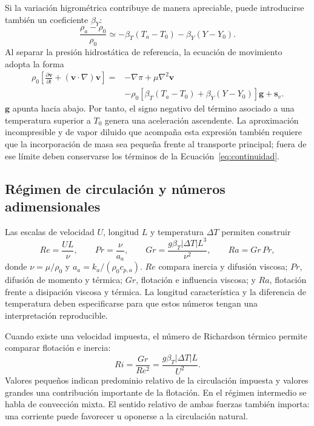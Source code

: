 Si la variación higrométrica contribuye de manera apreciable, puede introducirse también un coeficiente $\beta_Y$:
\begin{equation}
\frac{\rho_a-\rho_0}{\rho_0}
\simeq-\beta_T(T_a-T_0)-\beta_Y(Y-Y_0).
\label{eq:boussinesq_termohigrometrico}
\end{equation}
Al separar la presión hidrostática de referencia, la ecuación de movimiento adopta la forma
\begin{equation}
\begin{aligned}
\rho_0\left[\frac{\partial\mathbf v}{\partial t}
+(\mathbf v\cdot\nabla)\mathbf v\right]
={}&-\nabla\pi+\mu\nabla^2\mathbf v\\
&-\rho_0[\beta_T(T_a-T_0)+\beta_Y(Y-Y_0)]\mathbf g+\mathbf s_v.
\end{aligned}
\label{eq:movimiento_boussinesq}
\end{equation}
$\mathbf g$ apunta hacia abajo. Por tanto, el signo negativo del término asociado a una temperatura superior a $T_0$ genera una aceleración ascendente. La aproximación incompresible y de vapor diluido que acompaña esta expresión también requiere que la incorporación de masa sea pequeña frente al transporte principal; fuera de ese límite deben conservarse los términos de la Ecuación~\eqref{eq:continuidad}.

\subsection{Régimen de circulación y números adimensionales}

Las escalas de velocidad $U$, longitud $L$ y temperatura $\Delta T$ permiten construir
\begin{equation}
Re=\frac{UL}{\nu},
\qquad
Pr=\frac{\nu}{a_a},
\qquad
Gr=\frac{g\beta_T|\Delta T|L^3}{\nu^2},
\qquad
Ra=Gr\,Pr,
\label{eq:adimensionales_flujo}
\end{equation}
donde $\nu=\mu/\rho_0$ y $a_a=k_a/(\rho_0c_{p,a})$. $Re$ compara inercia y difusión viscosa; $Pr$, difusión de momento y térmica; $Gr$, flotación e influencia viscosa; y $Ra$, flotación frente a disipación viscosa y térmica. La longitud característica y la diferencia de temperatura deben especificarse para que estos números tengan una interpretación reproducible.

Cuando existe una velocidad impuesta, el número de Richardson térmico permite comparar flotación e inercia:
\begin{equation}
Ri=\frac{Gr}{Re^2}=\frac{g\beta_T|\Delta T|L}{U^2}.
\label{eq:richardson}
\end{equation}
Valores pequeños indican predominio relativo de la circulación impuesta y valores grandes una contribución importante de la flotación. En el régimen intermedio se habla de convección mixta. El sentido relativo de ambas fuerzas también importa: una corriente puede favorecer u oponerse a la circulación natural.

